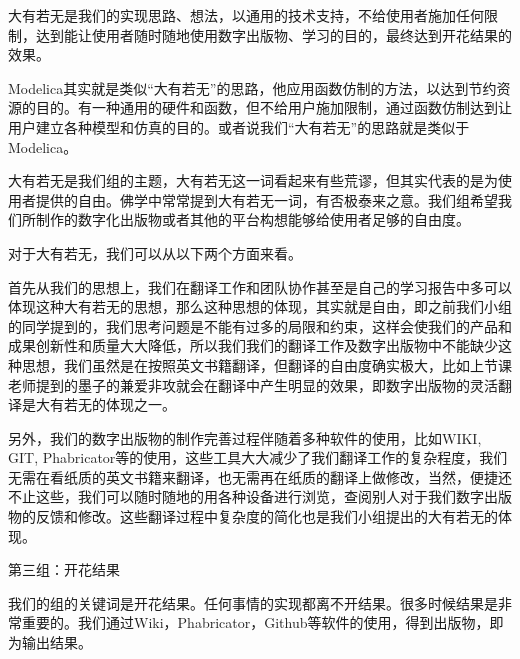 \documentclass[11pt,fleqn]{book}
\makeatletter
\numberwithin{dummy}{section}
\theoremstyle{ocrenumbox}
\theoremstyle{blacknumex}
\theoremstyle{blacknumbox}
\theoremstyle{ocrenum}
\renewcommand{\section}{\@startsection{section}{1}{\z@}
	{-4ex \@plus -1ex \@minus -.4ex}
	{1ex \@plus.2ex }
	{\normalfont\large\sffamily\bfseries}}
\makeatother
\begin{document}
大有若无是我们的实现思路、想法，以通用的技术支持，不给使用者施加任何限制，达到能让使用者随时随地使用数字出版物、学习的目的，最终达到开花结果的效果。

Modelica其实就是类似“大有若无”的思路，他应用函数仿制的方法，以达到节约资源的目的。有一种通用的硬件和函数，但不给用户施加限制，通过函数仿制达到让用户建立各种模型和仿真的目的。或者说我们“大有若无”的思路就是类似于Modelica。

大有若无是我们组的主题，大有若无这一词看起来有些荒谬，但其实代表的是为使用者提供的自由。佛学中常常提到大有若无一词，有否极泰来之意。我们组希望我们所制作的数字化出版物或者其他的平台构想能够给使用者足够的自由度。

对于大有若无，我们可以从以下两个方面来看。

首先从我们的思想上，我们在翻译工作和团队协作甚至是自己的学习报告中多可以体现这种大有若无的思想，那么这种思想的体现，其实就是自由，即之前我们小组的同学提到的，我们思考问题是不能有过多的局限和约束，这样会使我们的产品和成果创新性和质量大大降低，所以我们我们的翻译工作及数字出版物中不能缺少这种思想，我们虽然是在按照英文书籍翻译，但翻译的自由度确实极大，比如上节课老师提到的墨子的兼爱非攻就会在翻译中产生明显的效果，即数字出版物的灵活翻译是大有若无的体现之一。

另外，我们的数字出版物的制作完善过程伴随着多种软件的使用，比如WIKI, GIT, Phabricator等的使用，这些工具大大减少了我们翻译工作的复杂程度，我们无需在看纸质的英文书籍来翻译，也无需再在纸质的翻译上做修改，当然，便捷还不止这些，我们可以随时随地的用各种设备进行浏览，查阅别人对于我们数字出版物的反馈和修改。这些翻译过程中复杂度的简化也是我们小组提出的大有若无的体现。

\section{第三组：开花结果}

我们的组的关键词是开花结果。任何事情的实现都离不开结果。很多时候结果是非常重要的。我们通过Wiki，Phabricator，Github等软件的使用，得到出版物，即为输出结果。

\end{document}
